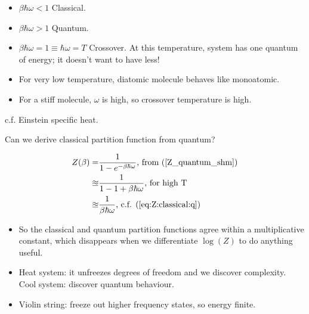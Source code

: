 \documentclass[]{article}
\begin{document}
\begin{itemize}
	\item $\beta\hbar \omega < 1$ Classical.
	\item $\beta\hbar \omega > 1$ Quantum.
	\item $\beta\hbar \omega = 1\equiv\hbar \omega=T$ Crossover. At this temperature, system has one quantum of energy; it doesn't want to have less!
	\item For very low temperature, diatomic molecule behaves like monoatomic.
	\item For a stiff molecule, $\omega$ is high, so crossover temperature is high.
\end{itemize}

c.f. Einstein specific heat.

Can we derive classical partition function from quantum?

\begin{align*}
Z(\beta) =&  \frac{1}{1 - e^{- \beta\hbar \omega}} \text{, from (\ref {Z_quantum_shm})}\\
\approxeq & \frac{1}{1 - 1 + \beta\hbar \omega}\text{, for high T}\\
\approxeq & \frac{1}{\beta\hbar \omega}\text{, c.f. (\ref{eq:Z:classical:q})}
\end{align*}

\begin{itemize}
	\item So the classical and quantum partition functions agree within a multiplicative constant, which disappears when we differentiate $\log(Z)$ to do anything useful.
	\item Heat system: it unfreezes degrees of freedom and we discover complexity. Cool system: discover quantum behaviour.
	\item Violin string: freeze out higher frequency states, so energy finite.
\end{itemize}
\end{document}
